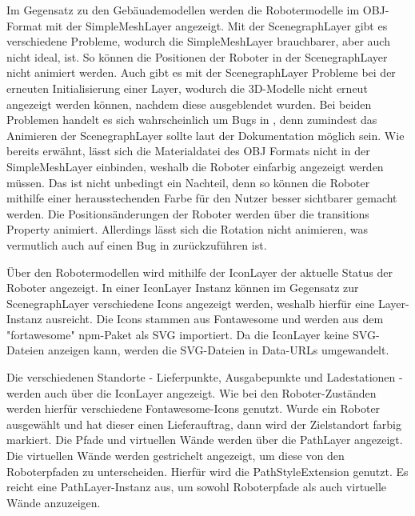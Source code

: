 Im Gegensatz zu den Gebäuademodellen werden die Robotermodelle im \ac{OBJ}-Format mit der SimpleMeshLayer angezeigt. Mit der ScenegraphLayer gibt es verschiedene Probleme, wodurch die SimpleMeshLayer brauchbarer, aber auch nicht ideal, ist. So können die Positionen der Roboter in der ScenegraphLayer nicht animiert werden. Auch gibt es mit der ScenegraphLayer Probleme bei der erneuten Initialisierung einer Layer, wodurch die 3D-Modelle nicht erneut angezeigt werden können, nachdem diese ausgeblendet wurden. Bei beiden Problemen handelt es sich wahrscheinlich um Bugs in \deckgl{}, denn zumindest das Animieren der ScenegraphLayer sollte laut der Dokumentation möglich sein. 
Wie bereits erwähnt, lässt sich die Materialdatei des \ac{OBJ} Formats nicht in der SimpleMeshLayer einbinden, weshalb die Roboter einfarbig angezeigt werden müssen. Das ist nicht unbedingt ein Nachteil, denn so können die Roboter mithilfe einer herausstechenden Farbe für den Nutzer besser sichtbarer gemacht werden. Die Positionsänderungen der Roboter werden über die transitions Property animiert. Allerdings lässt sich die Rotation nicht animieren, was vermutlich auch auf einen Bug in \deckgl{} zurückzuführen ist.

Über den Robotermodellen wird mithilfe der IconLayer der aktuelle Status der Roboter angezeigt. In einer IconLayer Instanz können im Gegensatz zur ScenegraphLayer verschiedene Icons angezeigt werden, weshalb hierfür eine Layer-Instanz ausreicht. 
Die Icons stammen aus Fontawesome und werden aus dem "fortawesome" npm-Paket als \ac{SVG} importiert.
Da die IconLayer keine \ac{SVG}-Dateien anzeigen kann, werden die SVG-Dateien in Data-URLs umgewandelt.

Die verschiedenen Standorte - Lieferpunkte, Ausgabepunkte und Ladestationen - werden auch über die IconLayer angezeigt. Wie bei den Roboter-Zuständen werden hierfür verschiedene Fontawesome-Icons genutzt. Wurde ein Roboter ausgewählt und hat dieser einen Lieferauftrag, dann wird der Zielstandort farbig markiert. Die Pfade und virtuellen Wände werden über die PathLayer angezeigt. 
Die virtuellen Wände werden gestrichelt angezeigt, um diese von den Roboterpfaden zu unterscheiden. Hierfür wird die PathStyleExtension genutzt.
Es reicht eine PathLayer-Instanz aus, um sowohl Roboterpfade als auch virtuelle Wände anzuzeigen.

